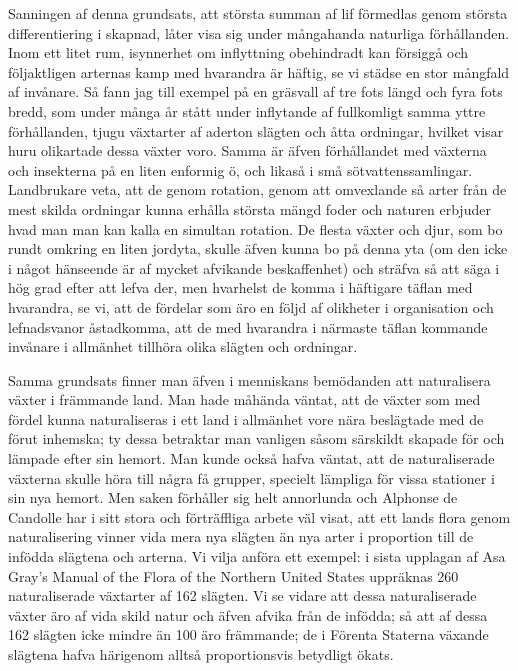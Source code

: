 Sanningen af denna grundsats, att största summan af lif förmedlas genom största differentiering i skapnad, låter visa sig under mångahanda naturliga förhållanden. Inom ett litet rum, isynnerhet om inflyttning obehindradt kan försiggå och följaktligen arternas kamp med hvarandra är häftig, se vi städse en stor mångfald af invånare. Så fann jag till exempel på en gräsvall af tre fots längd och fyra fots bredd, som under många år stått under inflytande af fullkomligt samma yttre förhållanden, tjugu växtarter af aderton slägten och åtta ordningar, hvilket visar huru olikartade dessa växter voro. Samma är äfven förhållandet med växterna och insekterna på en liten enformig ö, och likaså i små sötvattenssamlingar. Landbrukare veta, att de genom rotation, genom att omvexlande så arter från de mest skilda ordningar kunna erhålla största mängd foder och naturen erbjuder hvad man man kan kalla en simultan rotation. De flesta växter och djur, som bo rundt omkring en liten jordyta, skulle äfven kunna bo på denna yta (om den icke i något hänseende är af mycket afvikande beskaffenhet) och sträfva så att säga i hög grad efter att lefva der, men hvarhelst de komma i häftigare täflan med hvarandra, se vi, att de fördelar som äro en följd af olikheter i organisation och lefnadsvanor åstadkomma, att de med hvarandra i närmaste täflan kommande invånare i allmänhet tillhöra olika slägten och ordningar.

Samma grundsats finner man äfven i menniskans bemödanden att naturalisera växter i främmande land. Man hade måhända väntat, att de växter som med fördel kunna naturaliseras i ett land i allmänhet vore nära beslägtade med de förut inhemska; ty dessa betraktar man vanligen såsom särskildt skapade för och lämpade efter sin hemort. Man kunde också hafva väntat, att de naturaliserade växterna skulle höra till några få grupper, specielt lämpliga för vissa stationer i sin nya hemort. Men saken förhåller sig helt annorlunda och Alphonse de Candolle har i sitt stora och förträffliga arbete väl visat, att ett lands flora genom naturalisering vinner vida mera nya slägten än nya arter i proportion till de infödda slägtena och arterna. Vi vilja anföra ett exempel: i sista upplagan af Asa Gray’s Manual of the Flora of the Northern United States uppräknas 260 naturaliserade växtarter af 162 slägten. Vi se vidare att dessa naturaliserade växter äro af vida skild natur och äfven afvika från de infödda; så att af dessa 162 slägten icke mindre än 100 äro främmande; de i Förenta Staterna växande slägtena hafva härigenom alltså proportionsvis betydligt ökats.

